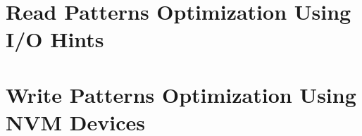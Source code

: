 \documentclass[a4paper,titlepage,oneside,11pt]{book}
\begin{document}
\setcounter{page}{5}

\part{Read Patterns Optimization Using I/O Hints}


%
%
\part{Write Patterns Optimization Using NVM Devices}



%
%
\cleardoublepage


\cleardoublepage
{}




\listoffigures
\cleardoublepage

\listoftables
\cleardoublepage

\end{document}
